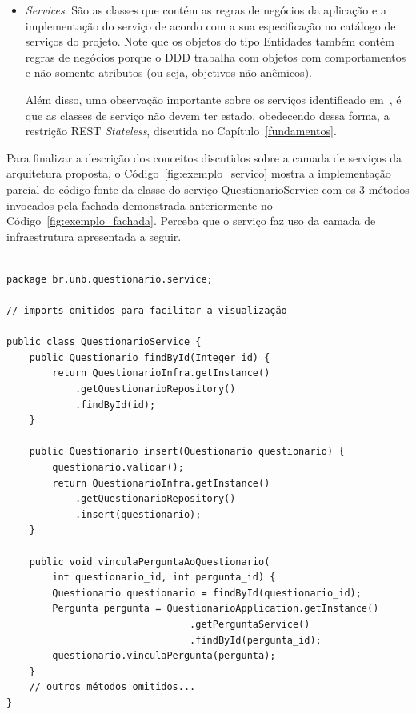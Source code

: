 \begin{itemize}
		\item \textit{Services}. São as classes que contém 
				as regras de negócios da aplicação e
				a implementação do serviço
				de acordo com a sua especificação 
				no catálogo de serviços do projeto.
				Note que os objetos do tipo Entidades
				também contém regras de negócios
				porque o \acrshort{DDD} trabalha com objetos 
				com comportamentos 
				e não somente atributos (ou seja, objetivos não anêmicos).
				
				Além disso, uma observação importante
				sobre os serviços identificado em~\cite{fielding1999rfc},
				é que as classes de serviço não devem ter estado,
				obedecendo dessa forma, a restrição REST \textit{Stateless},
				discutida no Capítulo~\ref{fundamentos}.
	\end{itemize}
	
	Para finalizar a descrição dos conceitos discutidos 
	sobre a camada de serviços da arquitetura proposta,	
	o Código~\ref{fig:exemplo_servico} mostra a implementação 
	parcial do código fonte da classe do 
	serviço QuestionarioService com os 3 métodos invocados
	pela fachada demonstrada anteriormente 
	no Código~\ref{fig:exemplo_fachada}. Perceba que 
	o serviço faz uso da camada de infraestrutura apresentada a seguir.
	
	
             
\renewcommand{\lstlistingname}{Código}             
\begin{lstlisting}[caption=Exemplo de implementação do serviço QuestionarioService., label=fig:exemplo_servico]

package br.unb.questionario.service;

// imports omitidos para facilitar a visualização

public class QuestionarioService {
	public Questionario findById(Integer id) {
		return QuestionarioInfra.getInstance()
			.getQuestionarioRepository()
			.findById(id);
	}
	
	public Questionario insert(Questionario questionario) {
		questionario.validar();
		return QuestionarioInfra.getInstance()
			.getQuestionarioRepository()
			.insert(questionario);
	}	
	
	public void vinculaPerguntaAoQuestionario(
		int questionario_id, int pergunta_id) {
		Questionario questionario = findById(questionario_id);
		Pergunta pergunta = QuestionarioApplication.getInstance()
								.getPerguntaService()
								.findById(pergunta_id);
		questionario.vinculaPergunta(pergunta);
	}	
	// outros métodos omitidos...
}
\end{lstlisting}
	

